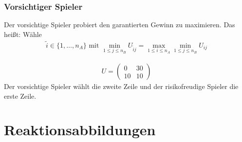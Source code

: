\subsubsection{Vorsichtiger Spieler}
Der vorsichtige Spieler probiert den garantierten Gewinn zu maximieren. Das heißt: Wähle 
\begin{align*}
	\tilde{i} \in \{1, \dots, n_A  \} \text{ mit } \min\limits_{1 \leq j \leq n_B} U_{\tilde{i}j}=\max\limits_{1 \leq i \leq n_A} \min\limits_{1 \leq j \leq n_B} U_{ij}
\end{align*} 

\begin{bsp}[Regenschirm?]
	\begin{align*} U=
		\begin{pmatrix}
			0 & 30 \\ 10 & 10
		\end{pmatrix}
	\end{align*}
	Der vorsichtige Spieler wählt die zweite Zeile und der risikofreudige Spieler die erste Zeile. 
\end{bsp}

\section{Reaktionsabbildungen}

